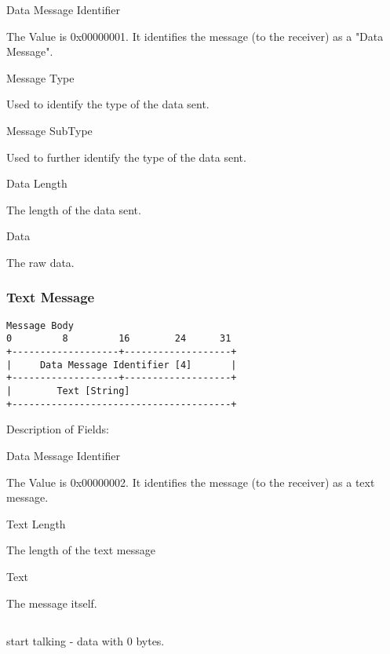 \documentclass[titlepage,oneside]{book}
\begin{document}
\par{} Data Message Identifier

\subpar{}  The Value is 0x00000001. It identifies the message (to the
  receiver) as a "Data Message".

\par{} Message Type

\subpar{}  Used to identify the type of the data sent.

\par{} Message SubType

\subpar{}  Used to further identify the type of the data sent.

\par{} Data Length

\subpar{}  The length of the data sent.

\par{} Data

\subpar{}  The raw data.

\subsubsection{Text Message}

\begin{verbatim}
Message Body
0         8         16        24      31
+-------------------+-------------------+
|     Data Message Identifier [4]       |
+-------------------+-------------------+
|        Text [String]
+---------------------------------------+
\end{verbatim}

\par{} Description of Fields:

\par{} Data Message Identifier

\subpar{}  The Value is 0x00000002. It identifies the message (to the
  receiver) as a text message.

\par{} Text Length

\subpar{}  The length of the text message

\par{} Text

\subpar{}  The message itself.

\subsection{}

\par{} start talking - data with 0 bytes.
\end{document}
